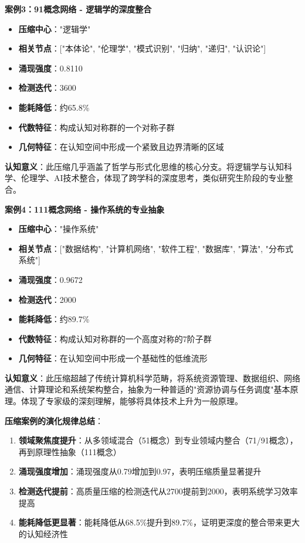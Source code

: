 \documentclass[12pt,a4paper]{article}
\begin{document}
\textbf{案例3：91概念网络 - 逻辑学的深度整合}
\begin{itemize}
\item \textbf{压缩中心}："逻辑学"
\item \textbf{相关节点}：["本体论", "伦理学", "模式识别", "归纳", "递归", "认识论"]
\item \textbf{涌现强度}：0.8110
\item \textbf{检测迭代}：3600
\item \textbf{能耗降低}：约65.8\%
\item \textbf{代数特征}：构成认知对称群的一个对称子群
\item \textbf{几何特征}：在认知空间中形成一个紧致且边界清晰的区域
\end{itemize}
\textbf{认知意义}：此压缩几乎涵盖了哲学与形式化思维的核心分支。将逻辑学与认知科学、伦理学、AI技术整合，体现了跨学科的深度思考，类似研究生阶段的专业整合。

\textbf{案例4：111概念网络 - 操作系统的专业抽象}
\begin{itemize}
\item \textbf{压缩中心}："操作系统"
\item \textbf{相关节点}：["数据结构", "计算机网络", "软件工程", "数据库", "算法", "分布式系统"]
\item \textbf{涌现强度}：0.9672
\item \textbf{检测迭代}：2000
\item \textbf{能耗降低}：约89.7\%
\item \textbf{代数特征}：构成认知对称群的一个高度对称的7阶子群
\item \textbf{几何特征}：在认知空间中形成一个基础性的低维流形
\end{itemize}
\textbf{认知意义}：此压缩超越了传统计算机科学范畴，将系统资源管理、数据组织、网络通信、计算理论和系统架构整合，抽象为一种普适的"资源协调与任务调度"基本原理。体现了专家级的深刻理解，能够将具体技术上升为一般原理。

\textbf{压缩案例的演化规律总结}：
\begin{enumerate}
\item \textbf{领域聚焦度提升}：从多领域混合（51概念）到专业领域内整合（71/91概念），再到原理性抽象（111概念）
\item \textbf{涌现强度增加}：涌现强度从0.79增加到0.97，表明压缩质量显著提升
\item \textbf{检测迭代提前}：高质量压缩的检测迭代从2700提前到2000，表明系统学习效率提高
\item \textbf{能耗降低更显著}：能耗降低从68.5\%提升到89.7\%，证明更深度的整合带来更大的认知经济性
\end{enumerate}
\end{document}
